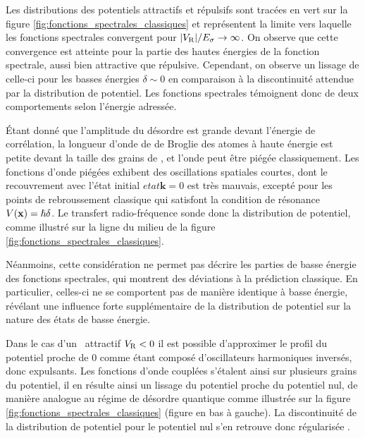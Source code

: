 Les distributions des potentiels attractifs et répulsifs sont tracées en vert sur la figure \ref{fig:fonctions_spectrales_classiques} et représentent la limite vers laquelle les fonctions spectrales convergent pour $|V_{\mathrm{R}}|/E_{\sigma}\rightarrow\infty$. On observe que cette convergence est atteinte pour la partie des hautes énergies de la fonction spectrale, aussi bien attractive que répulsive. Cependant, on observe un lissage de celle-ci pour les basses énergies $\delta\sim 0$ en comparaison à la discontinuité attendue par la distribution de potentiel. Les fonctions spectrales témoignent donc de deux comportements selon l'énergie adressée.

Étant donné que l'amplitude du désordre est grande devant l'énergie de corrélation, la longueur d'onde de de Broglie des atomes à haute énergie est petite devant la taille des grains de \speckle , et l'onde peut être piégée classiquement. Les fonctions d'onde piégées exhibent des oscillations spatiales courtes, dont le recouvrement avec l'état initial $etat{\mathbf{k}=0}$ est très mauvais, excepté pour les points de rebroussement classique qui satisfont la condition de résonance $V(\mathbf{x})=\hslash\delta$. Le transfert radio-fréquence sonde donc la distribution de potentiel, comme illustré sur la ligne du milieu de la figure \ref{fig:fonctions_spectrales_classiques}.

Néanmoins, cette considération ne permet pas décrire les parties de basse énergie des fonctions spectrales, qui montrent des déviations à la prédiction classique. En particulier, celles-ci ne se comportent pas de manière identique à basse énergie, révélant une influence forte supplémentaire de la distribution de potentiel sur la nature des états de basse énergie.

Dans le cas d'un \speckle\ attractif $V_{\mathrm{R}}<0$ il est possible d'approximer le profil du potentiel proche de 0 comme étant composé d'oscillateurs harmoniques inversés, donc expulsants. Les fonctions d'onde couplées s'étalent ainsi sur plusieurs grains du potentiel, il en résulte ainsi un lissage du potentiel proche du potentiel nul, de manière analogue au régime de désordre quantique comme illustrée sur la figure \ref{fig:fonctions_spectrales_classiques} (figure en bas à gauche). La discontinuité de la distribution de potentiel pour le potentiel nul s'en retrouve donc régularisée \citep{prat2016semiclassical}.


